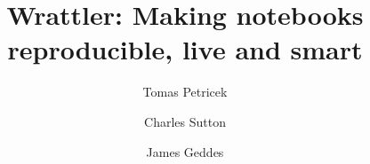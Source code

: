 \documentclass[sigplan]{acmart}\settopmatter{printfolios=true,printccs=false,printacmref=false}
\begin{document}
\title{Wrattler: \textnormal{Making notebooks reproducible, live and smart}}

\author{Tomas Petricek}
\author{Charles Sutton}
\author{James Geddes}

\newcommand{\vect}[1]{\langl #1 \rangl}
\newcommand{\langl}{\begin{picture}(4.5,7)
\put(1.1,2.5){\rotatebox{60}{\line(1,0){5.5}}}
\put(1.1,2.5){\rotatebox{300}{\line(1,0){5.5}}}
\end{picture}}
\newcommand{\rangl}{\begin{picture}(4.5,7)
\put(.9,2.5){\rotatebox{120}{\line(1,0){5.5}}}
\put(.9,2.5){\rotatebox{240}{\line(1,0){5.5}}}
\end{picture}}
\newcommand{\ball}[1]{\FPeval{\result}{clip(201+#1)}\textnormal{\ding{\result}}}
\newcommand{\lsep}{~\,|\,~}
\newcommand{\num}[1]{\textcolor{numclr}{#1}}
\newcommand{\str}[1]{\textnormal{\textcolor{strclr}{\sffamily "#1"}}}
\newcommand{\strf}[1]{\textnormal{\textcolor{strclr}{\sffamily #1}}}
\newcommand{\rstr}[1]{\textnormal{\textcolor{rstrclr}{\sffamily "#1"}}}
\newcommand{\ident}[1]{\textnormal{\sffamily #1}}
\newcommand{\qident}[1]{\textnormal{\sffamily \textquotesingle #1\textquotesingle}}
\newcommand{\dom}{\ident{dom}}
\newcommand{\kvd}[1]{\textnormal{\textcolor{kvdclr}{\sffamily #1}}}

\newcommand{\bndclr}[1]{\textcolor{kvdclr}{#1}}
\newcommand{\bkndclr}[1]{\textcolor{prepclr}{#1}}
\newcommand{\blblclr}[1]{\textcolor{numclr}{#1}}
\newcommand{\bnd}[1]{\textnormal{\textcolor{kvdclr}{\sffamily #1}}}
\newcommand{\bknd}[1]{\textnormal{\textcolor{prepclr}{\sffamily #1}}}
\newcommand{\blbl}[1]{\textnormal{\textcolor{numclr}{\sffamily #1}}}
\end{document}
